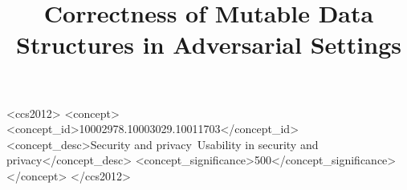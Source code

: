 \documentclass[sigconf, anonymous]{acmart}
\begin{document}
\title{Correctness of Mutable Data Structures in Adversarial Settings}



\begin{CCSXML}
<ccs2012>
<concept>
<concept_id>10002978.10003029.10011703</concept_id>
<concept_desc>Security and privacy~Usability in security and privacy</concept_desc>
<concept_significance>500</concept_significance>
</concept>
</ccs2012>
\end{CCSXML}



\maketitle




\end{document}
